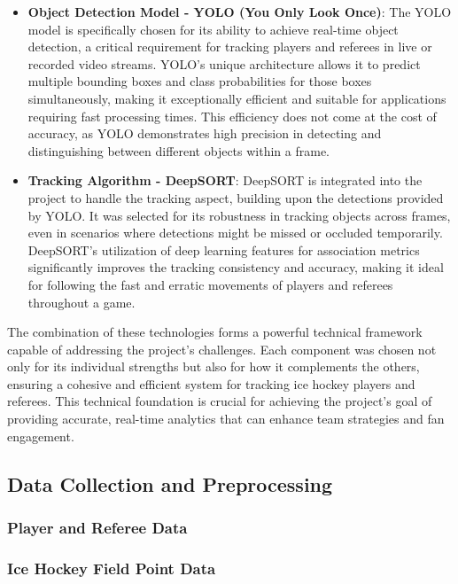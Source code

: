 \documentclass[12pt, letterpaper]{article}
\begin{document}
{\begin{spacing}{1.2}
\begin{itemize}
    \item \textbf{Object Detection Model - YOLO (You Only Look Once)}: The YOLO model is specifically chosen for its ability to achieve real-time object detection, a critical requirement for tracking players and referees in live or recorded video streams. YOLO's unique architecture allows it to predict multiple bounding boxes and class probabilities for those boxes simultaneously, making it exceptionally efficient and suitable for applications requiring fast processing times. This efficiency does not come at the cost of accuracy, as YOLO demonstrates high precision in detecting and distinguishing between different objects within a frame.
    
    \item \textbf{Tracking Algorithm - DeepSORT}: DeepSORT is integrated into the project to handle the tracking aspect, building upon the detections provided by YOLO. It was selected for its robustness in tracking objects across frames, even in scenarios where detections might be missed or occluded temporarily. DeepSORT's utilization of deep learning features for association metrics significantly improves the tracking consistency and accuracy, making it ideal for following the fast and erratic movements of players and referees throughout a game.
\end{itemize}

The combination of these technologies forms a powerful technical framework capable of addressing the project's challenges. Each component was chosen not only for its individual strengths but also for how it complements the others, ensuring a cohesive and efficient system for tracking ice hockey players and referees. This technical foundation is crucial for achieving the project's goal of providing accurate, real-time analytics that can enhance team strategies and fan engagement.

\end{spacing}
}


{
\setlength{\parskip}{0.3cm}
\subsection{Data Collection and Preprocessing}
\begin{spacing}{1.2}

\subsubsection{Player and Referee Data}

\subsubsection{Ice Hockey Field Point Data}

\end{spacing}
}
\end{document}
